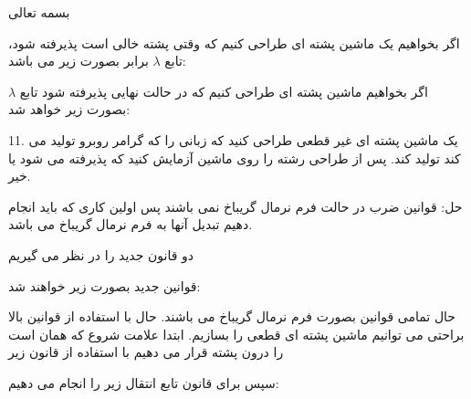 \documentclass[]{article}
\date{}
\begin{document}
\begin{center}
بسمه تعالی
\end{center}


اگر بخواهیم یک ماشین پشته ای طراحی کنیم که وقتی پشته خالی است پذیرفته شود، تابع $\lambda$ برابر بصورت زیر می باشد:

\begin{center}
\end{center}

اگر بخواهیم ماشین پشته ای طراحی کنیم که در حالت نهایی پذیرفته شود تابع $\lambda$ بصورت زیر خواهد شد:

\begin{center}
\end{center}

11. یک ماشین پشته ای غیر قطعی طراحی کنید که زبانی را که گرامر روبرو تولید می کند تولید کند. پس از طراحی رشته  را روی ماشین آزمایش کنید که پذیرفته می شود یا خیر.

حل: قوانین ضرب در حالت فرم نرمال گریباخ نمی باشند پس اولین کاری که باید انجام دهیم تبدیل آنها به فرم نرمال گریباخ می باشد.

\begin{center}
\end{center}

دو قانون جدید را در نظر می گیریم
\begin{center}
\end{center}

قوانین جدید بصورت زیر خواهند شد:
\begin{center}
\end{center}

حال تمامی قوانین بصورت فرم نرمال گریباخ می باشند. حال با استفاده از قوانین بالا براحتی می توانیم ماشین پشته ای قطعی را بسازیم.
ابتدا علامت شروع که همان  است را درون پشته قرار می دهیم با استفاده از قانون زیر
\begin{center}
\end{center}

سپس برای قانون  تابع انتقال زیر را انجام می دهیم:
\end{document}
